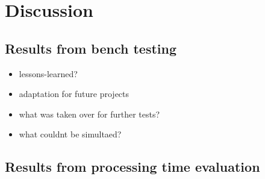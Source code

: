 \documentclass[ExampleMasters.tex]{subfiles}
\begin{document}
\clearpage
{\pagestyle{empty}\cleardoublepage}%
\chapter{Discussion}
\label{chap:discussion}

\section{Results from bench testing}
\label{sec:results_bench}

\begin{itemize}
	\item lessons-learned?
	\item adaptation for future projects
	\item what was taken over for further tests? 
	\item what couldnt be simultaed?
\end{itemize}

\section{Results from processing time evaluation}
\label{sec:results_processing_time}
\end{document}
